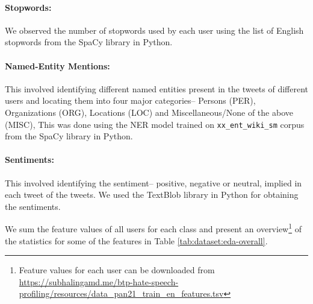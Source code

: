 \paragraph{Stopwords:} We observed the number of stopwords used by each user using the list of English stopwords from the SpaCy library \cite{spacy} in Python.

\paragraph{Named-Entity Mentions:} This involved identifying different named entities present in the tweets of different users and locating them into four major categories-- Persons (PER), Organizations (ORG), Locations (LOC) and Miscellaneous/None of the above (MISC), This was done using the NER model trained on \texttt{xx\_ent\_wiki\_sm}  corpus from the SpaCy library in Python.

\paragraph{Sentiments:} This involved identifying the sentiment-- positive, negative or neutral, implied in each tweet of the tweets. We used the TextBlob library \cite{textblob} in Python for obtaining the sentiments.



We sum the feature values of all users for each class and present an overview\footnote{Feature values for each user can be downloaded from \url{https://subhalingamd.me/btp-hate-speech-profiling/resources/data_pan21_train_en_features.tsv}} of the statistics for some of the features in Table \ref{tab:dataset:eda-overall}.


